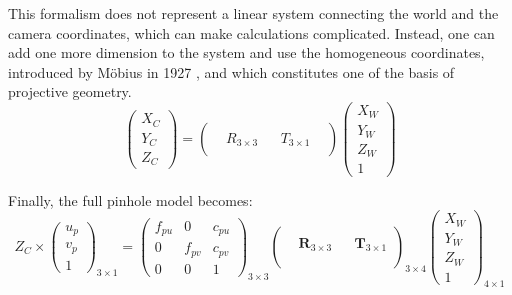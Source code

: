 This formalism does not represent a linear system connecting the world and the camera coordinates, which can make calculations complicated. Instead, one can add one more dimension to the system and use the homogeneous coordinates, introduced by Möbius in 1927 \cite{Mobius1827}, and which constitutes one of the basis of projective geometry.
\begin{equation}
  \begin{pmatrix}X_C\\Y_C\\Z_C\end{pmatrix}
  = \begin{pmatrix} &  & & \\ & R_{3\times 3} &  & T_{3\times 1} \\ &&&&\end{pmatrix} \begin{pmatrix}X_W\\Y_W\\Z_W\\1\end{pmatrix}
\end{equation}

Finally, the full pinhole model becomes:%
\begin{equation}\label{eq:pinhole}
  \boxed{
  Z_C \times \begin{pmatrix}u_p\\v_p\\1\end{pmatrix}_{\!\!3\times 1} 
  = \begin{pmatrix}f_{pu} & 0 & c_{pu}\\ 0 & f_{pv} & c_{pv} \\ 0&0&1\end{pmatrix}_{\!\!3\times 3}
    \begin{pmatrix} \\ & \textbf{R}_{3\times 3} &  & \textbf{T}_{3\times 1} \\  \\\end{pmatrix}_{\!\!3\times 4} 
    \begin{pmatrix}X_W\\Y_W\\Z_W\\1\end{pmatrix}_{\!\!4\times1}
  }
\end{equation}

